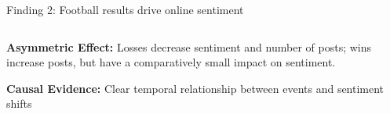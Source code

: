 \documentclass[10pt]{beamer}
\begin{document}
\begin{frame}{Finding 2: Football results drive online sentiment}

\begin{columns}
\begin{column}{0.7\textwidth}
\begin{table}
\centering
{}
\caption{Posting volume and sentiment in FC subreddits following different match results reveal an asymmetric emotional response.}
\label{tab:match_results_combined}
\end{table}

\textbf{Asymmetric Effect: }
Losses decrease sentiment and number of posts; wins increase posts, but have a comparatively small impact on sentiment.

\textbf{Causal Evidence:} Clear temporal relationship between events and sentiment shifts

\end{column}
\begin{column}{0.3\textwidth}
\centering


\end{column}
\end{columns}
\end{frame}
\end{document}
